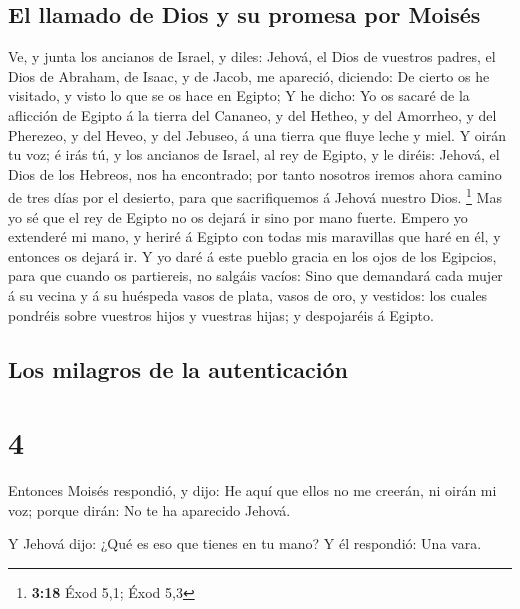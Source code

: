 \hypertarget{el-llamado-de-dios-y-su-promesa-por-moisuxe9s}{%
\subsection{El llamado de Dios y su promesa por
Moisés}\label{el-llamado-de-dios-y-su-promesa-por-moisuxe9s}}

 Ve, y junta los ancianos de Israel, y diles: Jehová, el
Dios de vuestros padres, el Dios de Abraham, de Isaac, y de Jacob, me
apareció, diciendo: De cierto os he visitado, y visto lo que se os hace
en Egipto;  Y he dicho: Yo os sacaré de la aflicción de
Egipto á la tierra del Cananeo, y del Hetheo, y del Amorrheo, y del
Pherezeo, y del Heveo, y del Jebuseo, á una tierra que fluye leche y
miel.  Y oirán tu voz; é irás tú, y los ancianos de
Israel, al rey de Egipto, y le diréis: Jehová, el Dios de los Hebreos,
nos ha encontrado; por tanto nosotros iremos ahora camino de tres días
por el desierto, para que sacrifiquemos á Jehová nuestro Dios.
\footnote{\textbf{3:18} Éxod 5,1; Éxod 5,3}  Mas yo sé
que el rey de Egipto no os dejará ir sino por mano fuerte.
 Empero yo extenderé mi mano, y heriré á Egipto con todas
mis maravillas que haré en él, y entonces os dejará ir. 
Y yo daré á este pueblo gracia en los ojos de los Egipcios, para que
cuando os partiereis, no salgáis vacíos:  Sino que
demandará cada mujer á su vecina y á su huéspeda vasos de plata, vasos
de oro, y vestidos: los cuales pondréis sobre vuestros hijos y vuestras
hijas; y despojaréis á Egipto.

\hypertarget{los-milagros-de-la-autenticaciuxf3n}{%
\subsection{Los milagros de la
autenticación}\label{los-milagros-de-la-autenticaciuxf3n}}

\hypertarget{section-3}{%
\section{4}\label{section-3}}

 Entonces Moisés respondió, y dijo: He aquí que ellos no
me creerán, ni oirán mi voz; porque dirán: No te ha aparecido Jehová.

 Y Jehová dijo: ¿Qué es eso que tienes en tu mano? Y él
respondió: Una vara.

